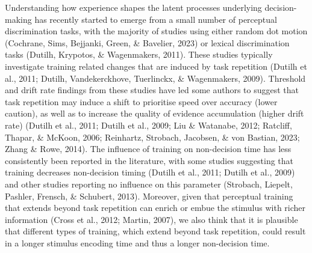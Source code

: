 \documentclass[
  english,
  man, donotrepeattitle,floatsintext]{apa6}
\begin{document}
Understanding how experience shapes the latent processes underlying decision-making has recently started to emerge from a small number of perceptual discrimination tasks, with the majority of studies using either random dot motion (Cochrane, Sims, Bejjanki, Green, \& Bavelier, 2023) or lexical discrimination tasks (Dutilh, Krypotos, \& Wagenmakers, 2011). These studies typically investigate training related changes that are induced by task repetition (Dutilh et al., 2011; Dutilh, Vandekerckhove, Tuerlinckx, \& Wagenmakers, 2009). Threshold and drift rate findings from these studies have led some authors to suggest that task repetition may induce a shift to prioritise speed over accuracy (lower caution), as well as to increase the quality of evidence accumulation (higher drift rate) (Dutilh et al., 2011; Dutilh et al., 2009; Liu \& Watanabe, 2012; Ratcliff, Thapar, \& McKoon, 2006; Reinhartz, Strobach, Jacobsen, \& von Bastian, 2023; Zhang \& Rowe, 2014). The influence of training on non-decision time has less consistently been reported in the literature, with some studies suggesting that training decreases non-decision timing (Dutilh et al., 2011; Dutilh et al., 2009) and other studies reporting no influence on this parameter (Strobach, Liepelt, Pashler, Frensch, \& Schubert, 2013). Moreover, given that perceptual training that extends beyond task repetition can enrich or embue the stimulus with richer information (Cross et al., 2012; Martin, 2007), we also think that it is plausible that different types of training, which extend beyond task repetition, could result in a longer stimulus encoding time and thus a longer non-decision time.
\end{document}
